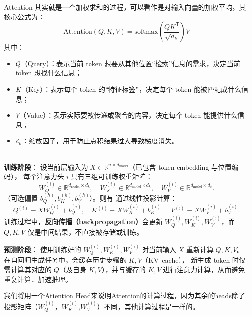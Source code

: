 Attention 其实就是一个加权求和的过程，可以看作是对输入向量的加权平均。其核心公式为：
\begin{equation}
\text{Attention}(Q, K, V) = \text{softmax} \left( \frac{Q K^\mathsf{T}}{\sqrt{d_k}} \right) V
\end{equation}  
其中：
\begin{itemize}
    \item $Q$（Query）：表示当前 token 想要从其他位置“检索”信息的需求，决定当前 token 想找什么信息；
    \item $K$（Key）：表示每个 token 的“特征标签”，决定每个 token 能被匹配成什么信息；
    \item $V$（Value）：表示实际要被传递或聚合的内容，决定每个 token 能提供什么信息；
    \item $d_k$：缩放因子，用于防止点积结果过大导致梯度消失。
\end{itemize}

{
\\
\textbf{训练阶段}：
设当前层输入为 $X \in \mathbb{R}^{n \times d_{\text{model}}}$（已包含 token embedding 与位置编码），
每个注意力头 $i$ 具有三组可训练权重矩阵：
\[
W_Q^{(i)} \in \mathbb{R}^{d_{\text{model}} \times d_k},\quad
W_K^{(i)} \in \mathbb{R}^{d_{\text{model}} \times d_k},\quad
W_V^{(i)} \in \mathbb{R}^{d_{\text{model}} \times d_v}.
\]
（可选偏置 $b_Q^{(h)},b_K^{(h)},b_V^{(h)}$）。则有
通过线性投影计算：
\[
Q^{(i)} = X W_Q^{(i)} + b_Q^{(i)},\quad
K^{(i)} = X W_K^{(i)} + b_K^{(i)},\quad
V^{(i)} = X W_V^{(i)} + b_V^{(i)}.
\]
训练过程中，\textbf{反向传播（backpropagation）}会更新 $W_Q^{(i)},W_K^{(i)},W_V^{(i)}$，而 $Q,K,V$ 仅是中间结果，不直接被存储或训练。

\medskip
\textbf{预测阶段}：
使用训练好的 $W_Q^{(i)},W_K^{(i)},W_V^{(i)}$ 对当前输入 $X$ 重新计算 $Q,K,V$。
在自回归生成任务中，会缓存历史步骤的 $K,V$（KV~cache），
新生成 token 时仅需计算其对应的 $Q$（及自身 $K,V$），并与缓存的 $K,V$ 进行注意力计算，从而避免重复计算、加速推理。
}
我们将用一个Attention Head来说明Attention的计算过程，因为其余的heads除了投影矩阵（$W_Q^{(i)}$，$W_K^{(i)}$,$W_V^{(i)}$）不同，其他计算过程是一样的。
